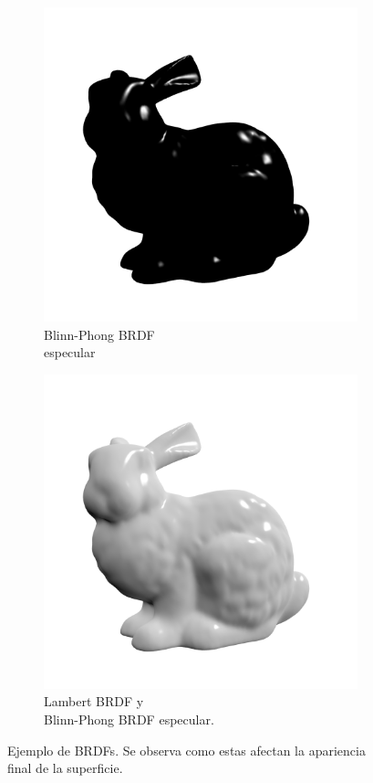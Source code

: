 \begin{figure}[H]
\begin{subfigure}[t]{0.33\textwidth}
		\includegraphics[width=\linewidth]{media/specular_bunny.png}
		\caption*{Blinn-Phong \ac{BRDF}\\ especular}
	\end{subfigure}%
	\begin{subfigure}[t]{0.33\textwidth}
		\centering
		\captionsetup{justification=centering}
		\includegraphics[width=\linewidth]{media/diffuse_specular_bunny.png}
		\caption*{Lambert \ac{BRDF} y \\Blinn-Phong \ac{BRDF} especular.}
	\end{subfigure}
	\caption{Ejemplo de \ac{BRDF}s. Se observa como estas afectan la apariencia final de la superficie.}
	\label{fig:brdfs_comparison}
\end{figure}

